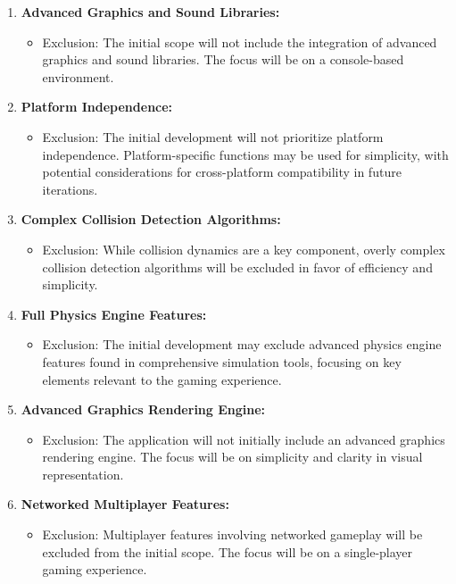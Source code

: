 \documentclass[
]{article}
\begin{document}
\begin{enumerate}
\def\labelenumi{\arabic{enumi}.}
\item
  \textbf{Advanced Graphics and Sound Libraries:}

  \begin{itemize}
  \item
    Exclusion: The initial scope will not include the integration of
    advanced graphics and sound libraries. The focus will be on a
    console-based environment.
  \end{itemize}
\item
  \textbf{Platform Independence:}

  \begin{itemize}
  \item
    Exclusion: The initial development will not prioritize platform
    independence. Platform-specific functions may be used for
    simplicity, with potential considerations for cross-platform
    compatibility in future iterations.
  \end{itemize}
\item
  \textbf{Complex Collision Detection Algorithms:}

  \begin{itemize}
  \item
    Exclusion: While collision dynamics are a key component, overly
    complex collision detection algorithms will be excluded in favor of
    efficiency and simplicity.
  \end{itemize}
\item
  \textbf{Full Physics Engine Features:}

  \begin{itemize}
  \item
    Exclusion: The initial development may exclude advanced physics
    engine features found in comprehensive simulation tools, focusing on
    key elements relevant to the gaming experience.
  \end{itemize}
\item
  \textbf{Advanced Graphics Rendering Engine:}

  \begin{itemize}
  \item
    Exclusion: The application will not initially include an advanced
    graphics rendering engine. The focus will be on simplicity and
    clarity in visual representation.
  \end{itemize}
\item
  \textbf{Networked Multiplayer Features:}

  \begin{itemize}
  \item
    Exclusion: Multiplayer features involving networked gameplay will be
    excluded from the initial scope. The focus will be on a
    single-player gaming experience.
  \end{itemize}
\end{enumerate}
\end{document}
